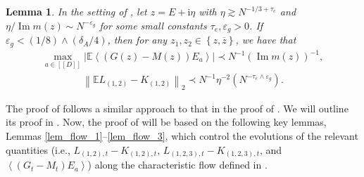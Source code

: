 \documentclass[10pt,reqno]{amsart}
\numberwithin{equation}{section}
\numberwithin{figure}{section}
\theoremstyle{plain} %
\newtheorem{lemma}[theorem]{Lemma}
\theoremstyle{definition} %
\newcommand{\E}{\mathbb{E}}
\newcommand{\ii}{\mathrm{i}}
\renewcommand{\bar}{\overline}
\newcommand{\qq}[1]{[\![{#1}]\!]}
\newcommand{\p}[1]{({#1})}
\newcommand{\pa}[1]{\left({#1}\right)}
\newcommand{\ha}[1]{\left\{{#1}\right\}}
\newcommand{\absa}[1]{\left\lvert #1 \right\rvert}
\newcommand{\avga}[1]{\left\langle #1 \right\rangle}
\DeclareMathOperator{\im}{\mathrm{Im}}
\newcommand{\e}{{\varepsilon}}
\numberwithin{equation}{section}
\begin{document}
\begin{lemma}\label{lemma_G_large_2}
In the setting of , let $z=E+\ii \eta$ with $\eta\gtrsim N^{-1/3+\tau_e}$ and $\eta/\im m (z) \sim N^{-\varepsilon_g}$ for some small constants $\tau_e,\e_g>0$. If $\varepsilon_g<\p{1/8}\wedge \p{\delta_A/4}$, then for any $z_1,z_2\in\ha{z,\bar{z}}$, we have that
    \begin{equation}\label{largG_1G}
        \begin{aligned}
            \max_{a\in \qq D}\absa{\E\avga{\pa{G (z) -M (z) }E_a}}\prec N^{-1}\pa{\im m (z) }^{-1},
        \end{aligned}
    \end{equation}
    \begin{equation}\label{largG_Ex}
        \begin{aligned}
            \left\|\E L_{(1,2)}-K_{(1,2)}\right\|_2\prec N^{-1}\eta^{-2}\pa{N^{-\tau_e\wedge \varepsilon_g}}.
        \end{aligned}
    \end{equation}
\end{lemma}

The proof of  follows a similar approach to that in the proof of \cite[Lemma 4.3]{stone2024randommatrixmodelquantum}. We will outline its proof in .
Now, the proof of  will be based on the following key lemmas, Lemmas \ref{lem_flow_1}--\ref{lem_flow_3}, which control the evolutions of the relevant quantities (i.e., $L_{(1,2), t}-K_{(1,2), t}$, $L_{(1,2,3), t}-K_{(1,2,3), t}$, and $\left\langle\left(G_t-M_t\right) E_a\right\rangle$) along the characteristic flow defined in .


\end{document}
